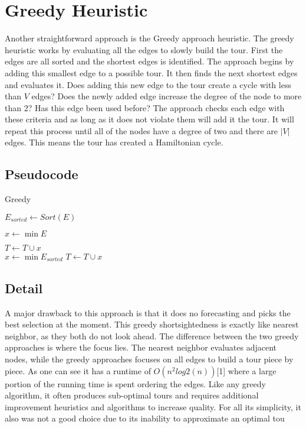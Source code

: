 \documentclass{article}
\begin{document}
\section{Greedy Heuristic}

Another straightforward approach is the Greedy approach heuristic. The greedy
heuristic works by evaluating all the edges to slowly build the tour. First the
edges are all sorted and the shortest edges is identified. The approach begins
by adding this smallest edge to a possible tour. It then finds the next shortest
edges and evaluates it. Does adding this new edge to the tour create a cycle
with less than $V$ edges? Does the newly added edge increase the degree of the
node to more than 2? Has this edge been used before? The approach checks each
edge with these criteria and as long as it does not violate them will add it the
tour. It will repeat this process until all of the nodes have a degree of two
and there are $|V|$ edges. This means the tour has created a Hamiltonian cycle.


\subsection{Pseudocode}

\FloatBarrier

\begin{algorithm}
  \caption{Greedy}
  \label{alg_greedy}
  \begin{algorithmic}[1]

    \State $E_{\textit{sorted}} \gets \textit{Sort}(E)$

    \State $x \gets \min E$

    \State $T \gets T \cup {x}$
    \\
      \State $x \gets \min E_{\textit{sorted}}$
            \State $T \gets T \cup x$
          \EndIf
        \EndIf
      \EndIf
    \EndWhile
    \\
    \EndProcedure
  \end{algorithmic}
\end{algorithm}

\FloatBarrier

\subsection{Detail}
A major drawback to this approach is that it does no forecasting and picks the best selection at
the moment. This greedy shortsightedness is exactly like nearest neighbor, as they both do not
look ahead. The difference between the two greedy approaches is where the focus lies. The
nearest neighbor evaluates adjacent nodes, while the greedy approaches focuses on all edges to
build a tour piece by piece. As one can see it has a runtime of $O(n^2 log2(n))$[1] where a large
portion of the running time is spent ordering the edges. Like any greedy algorithm, it often
produces sub-optimal tours and requires additional improvement heuristics and algorithms to
increase quality. For all its simplicity, it also was not a good choice due to its inability to
approximate an optimal tou
\end{document}
